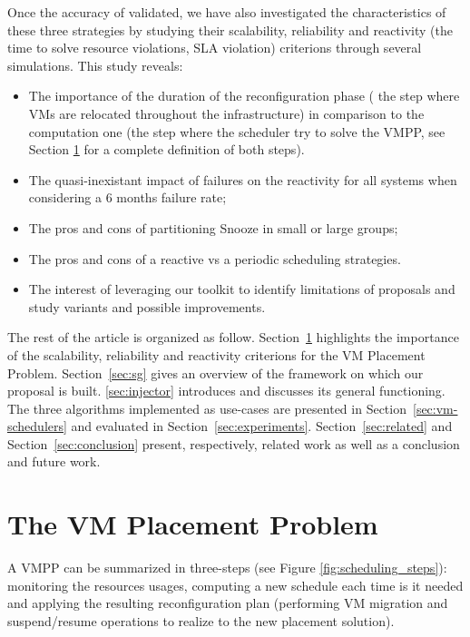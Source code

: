 Once the accuracy of \vmps validated, we have also investigated the
characteristics of these three strategies by studying their
scalability, reliability and reactivity (\ie the time to solve
resource violations, \aka SLA violation) criterions through several
simulations. This study reveals:
\begin{itemize}
\item The importance of the duration of the reconfiguration phase (\ie
  the step where VMs are relocated throughout the infrastructure) in
  comparison to the computation one (\ie the step where the scheduler
  try to solve the VMPP, see Section \ref{sec:vmpp} for a complete
  definition of both steps).
\item The quasi-inexistant impact of failures on the reactivity for
  all systems when considering a 6 months failure
  rate;
\item The pros and cons of partitioning Snooze in small or large
  groups;
\item The pros and cons of a reactive vs a periodic scheduling
  strategies.
\item The interest of leveraging our toolkit to identify limitations
  of proposals and study variants and possible improvements.
\end{itemize}

The rest of the article is
organized as follow. Section~\ref{sec:vmpp} highlights the importance
of the scalability, reliability and reactivity criterions for the VM
Placement Problem.
Section~\ref{sec:sg} gives an overview of the \sg
framework on which our proposal is built. \ref{sec:injector}
introduces \vmps and discusses its general functioning. The three
algorithms implemented as use-cases are presented in
Section~\ref{sec:vm-schedulers} and evaluated in
Section~\ref{sec:experiments}. Section~\ref{sec:related} and
Section~\ref{sec:conclusion} present, respectively, related work as
well as a conclusion and future work.

\section{The VM Placement Problem}
\label{sec:vmpp}

A VMPP can be summarized in three-steps (see Figure
\ref{fig:scheduling_steps}): monitoring the resources usages,
computing a new schedule each time is it needed and applying the
resulting reconfiguration plan (\ie performing VM migration and
suspend/resume operations to realize to the new placement solution).

